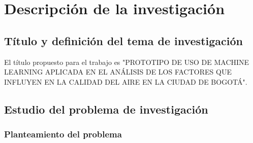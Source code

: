 
\chapter{Descripción de la investigación}

\section{Título y definición del tema de investigación}

El título propuesto para el trabajo es "PROTOTIPO DE USO DE MACHINE LEARNING APLICADA EN EL ANÁLISIS DE LOS FACTORES QUE INFLUYEN EN LA CALIDAD DEL AIRE EN LA CIUDAD DE BOGOTÁ".


\section{Estudio del problema de investigación}

\subsection{Planteamiento del problema}

